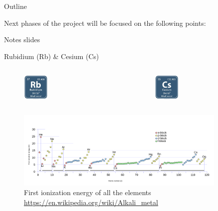 \documentclass[10pt]{beamer}
\begin{document}
\begin{frame}{Outline}

    Next phases of the project will be focused on the following points:

\end{frame}



\appendix

\begin{frame}[standout]
    Notes slides
\end{frame}



\begin{frame}{Rubidium (Rb) \& Cesium (Cs)}

    \begin{columns}

        \begin{figure}
            \centering
            \includegraphics[width=0.3\textwidth]{img/Rubidium-Symbol}
        \end{figure}

        \begin{figure}
            \centering
            \includegraphics[width=0.3\textwidth]{img/Cesium-Symbol}
        \end{figure}

    \end{columns}

    \begin{figure}
        \centering
        \includegraphics[width=0.9\textwidth]{img/First_Ionization_Energy}
        \caption{First ionization energy of all the elements \url{https://en.wikipedia.org/wiki/Alkali_metal}}
    \end{figure}

\end{frame}
\end{document}
